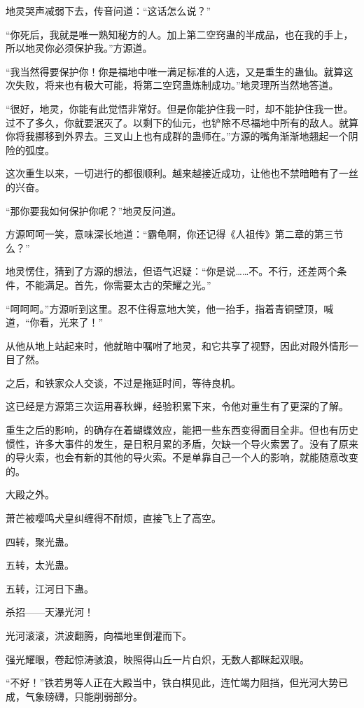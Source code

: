 \begin{this_body}
地灵哭声减弱下去，传音问道：“这话怎么说？”

“你死后，我就是唯一熟知秘方的人。加上第二空窍蛊的半成品，也在我的手上，所以地灵你必须保护我。”方源道。

“我当然得要保护你！你是福地中唯一满足标准的人选，又是重生的蛊仙。就算这次失败，将来也有极大可能，将第二空窍蛊炼制成功。”地灵理所当然地答道。

“很好，地灵，你能有此觉悟非常好。但是你能护住我一时，却不能护住我一世。过不了多久，你就要泯灭了。以剩下的仙元，也铲除不尽福地中所有的敌人。就算你将我挪移到外界去。三叉山上也有成群的蛊师在。”方源的嘴角渐渐地翘起一个阴险的弧度。

这次重生以来，一切进行的都很顺利。越来越接近成功，让他也不禁暗暗有了一丝的兴奋。

“那你要我如何保护你呢？”地灵反问道。

方源呵呵一笑，意味深长地道：“霸龟啊，你还记得《人祖传》第二章的第三节么？”

地灵愣住，猜到了方源的想法，但语气迟疑：“你是说……不。不行，还差两个条件，不能满足。首先，你需要太古的荣耀之光。”

“呵呵呵。”方源听到这里。忍不住得意地大笑，他一抬手，指着青铜壁顶，喊道，“你看，光来了！”

从他从地上站起来时，他就暗中嘱咐了地灵，和它共享了视野，因此对殿外情形一目了然。

之后，和铁家众人交谈，不过是拖延时间，等待良机。

这已经是方源第三次运用春秋蝉，经验积累下来，令他对重生有了更深的了解。

重生之后的影响，的确存在着蝴蝶效应，能把一些东西变得面目全非。但也有历史惯性，许多大事件的发生，是日积月累的矛盾，欠缺一个导火索罢了。没有了原来的导火索，也会有新的其他的导火索。不是单靠自己一个人的影响，就能随意改变的。

大殿之外。

萧芒被嘤鸣犬皇纠缠得不耐烦，直接飞上了高空。

四转，聚光蛊。

五转，太光蛊。

五转，江河日下蛊。

杀招——天瀑光河！

光河滚滚，洪波翻腾，向福地里倒灌而下。

强光耀眼，卷起惊涛骇浪，映照得山丘一片白炽，无数人都眯起双眼。

“不好！”铁若男等人正在大殿当中，铁白棋见此，连忙竭力阻挡，但光河大势已成，气象磅礴，只能削弱部分。


\end{this_body}
